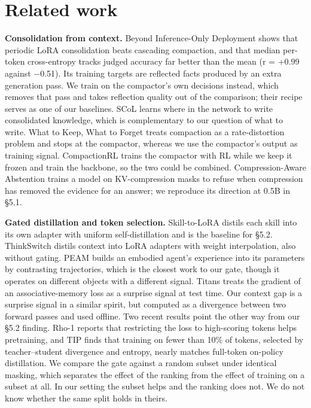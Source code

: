 \documentclass[10pt]{article}
\begin{document}
\section{Related work}

\textbf{Consolidation from context.} Beyond Inference-Only Deployment \citep{dennis2026beyond} shows that periodic LoRA
consolidation beats cascading compaction, and that median per-token cross-entropy tracks
judged accuracy far better than the mean (r = +0.99 against −0.51). Its training targets
are reflected facts produced by an extra generation pass. We train on the compactor's own
decisions instead, which removes that pass and takes reflection quality out of the
comparison; their recipe serves as one of our baselines. SCoL \citep{wang2026scol} learns where in the network
to write consolidated knowledge, which is complementary to our question of what to write.
What to Keep, What to Forget \citep{colaco2026keep} treats compaction as a rate-distortion problem and stops at
the compactor, whereas we use the compactor's output as training signal. CompactionRL \citep{li2026compactionrl}
trains the compactor with RL while we keep it frozen and train the backbone, so the two could
be combined. Compression-Aware Abstention \citep{khodabandehlou2026abstention} trains a model on KV-compression masks to
refuse when compression has removed the evidence for an answer; we reproduce its direction at
0.5B in §5.1.

\textbf{Gated distillation and token selection.} Skill-to-LoRA \citep{zhang2026skill} distils each skill into its own
adapter with uniform self-distillation and is the baseline for §5.2. ThinkSwitch \citep{saini2026thinkswitch} distils
context into LoRA adapters with weight interpolation, also without gating. PEAM \citep{guo2026peam} builds an
embodied agent's experience into its parameters by contrasting trajectories, which is the
closest work to our gate, though it operates on different objects with a different signal.
Titans \citep{behrouz2024titans} treats the gradient of an associative-memory loss as a surprise signal at test
time. Our context gap is a surprise signal in a similar spirit, but computed as a divergence
between two forward passes and used offline. Two recent results point the other way from our
§5.2 finding. Rho-1\citep{lin2024rho} reports that restricting the loss to high-scoring tokens helps
pretraining, and TIP \citep{xu2026tip} finds that training on fewer than 10\% of tokens, selected by
teacher--student divergence and entropy, nearly matches full-token on-policy distillation. We
compare the gate against a random subset under identical masking, which separates the effect
of the ranking from the effect of training on a subset at all. In our setting the subset
helps and the ranking does not. We do not know whether the same split holds in theirs.
\end{document}
